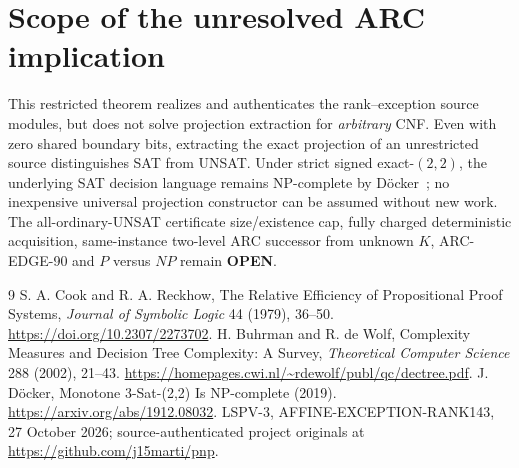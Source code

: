 \documentclass[11pt]{article}
\begin{document}
\section{Scope of the unresolved ARC implication}
This restricted theorem realizes and authenticates the
rank--exception source modules, but does not solve
projection extraction for \emph{arbitrary} CNF.
Even with zero shared boundary bits, extracting the exact
projection of an unrestricted source distinguishes SAT
from UNSAT. Under strict signed exact-$(2,2)$, the
underlying SAT decision language remains NP-complete
by D\"ocker~\cite{DOK}; no inexpensive universal
projection constructor can be assumed without new work.
The all-ordinary-UNSAT certificate size/existence cap,
fully charged deterministic acquisition, same-instance
two-level ARC successor from unknown $K$,
ARC-EDGE-90 and $P$ versus $NP$ remain \textbf{OPEN}.

\begin{thebibliography}{9}
 S. A. Cook and R. A. Reckhow,
The Relative Efficiency of Propositional Proof Systems,
\emph{Journal of Symbolic Logic} 44 (1979), 36--50.
\url{https://doi.org/10.2307/2273702}.
 H. Buhrman and R. de Wolf,
Complexity Measures and Decision Tree Complexity: A Survey,
\emph{Theoretical Computer Science} 288 (2002), 21--43.
\url{https://homepages.cwi.nl/~rdewolf/publ/qc/dectree.pdf}.
 J. D\"ocker,
Monotone 3-Sat-(2,2) Is NP-complete (2019).
\url{https://arxiv.org/abs/1912.08032}.
 LSPV-3, AFFINE-EXCEPTION-RANK143,
27 October 2026; source-authenticated project originals at
\url{https://github.com/j15marti/pnp}.
\end{thebibliography}
\end{document}
